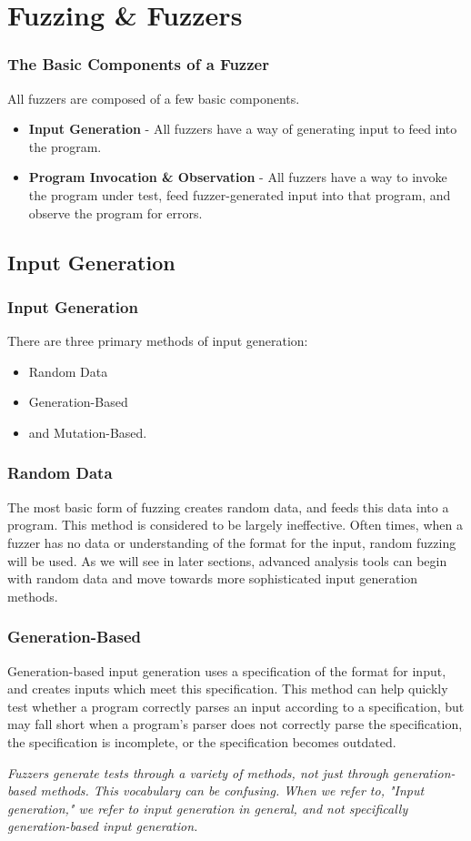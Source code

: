 \documentclass{beamer}
\begin{document}
\section{Fuzzing {\&} Fuzzers}

\begin{frame}
\frametitle{The Basic Components of a Fuzzer}
All fuzzers are composed of a few basic components.

\begin{itemize}
  \item \textbf{Input Generation} - All fuzzers have a way of generating input to feed into the program.
  \item \textbf{Program Invocation \& Observation} - All fuzzers have a way to invoke the program under test, feed fuzzer-generated input into that program, and observe the program for errors.
\end{itemize}
\end{frame}

\subsection{Input Generation}
\begin{frame}
\frametitle{Input Generation}
There are three primary methods of input generation:

\begin{itemize}
  \item Random Data
  \item Generation-Based
  \item and Mutation-Based.
\end{itemize}
\end{frame}

\begin{frame}
\frametitle{Random Data}
The most basic form of fuzzing creates random data, and feeds this data into a program. This method is considered to be largely ineffective. Often times, when a fuzzer has no data or understanding of the format for the input, random fuzzing will be used. As we will see in later sections, advanced analysis tools can begin with random data and move towards more sophisticated input generation methods.
\end{frame}

\begin{frame}
\frametitle{Generation-Based}
Generation-based input generation uses a specification of the format for input, and creates inputs which meet this specification. This method can help quickly test whether a program correctly parses an input according to a specification, but may fall short when a program's parser does not correctly parse the specification, the specification is incomplete, or the specification becomes outdated.
\par
\textit{Fuzzers generate tests through a variety of methods, not just through generation-based methods. This vocabulary can be confusing. When we refer to, "Input generation," we refer to input generation in general, and not specifically generation-based input generation.}
\end{frame}
\end{document}
